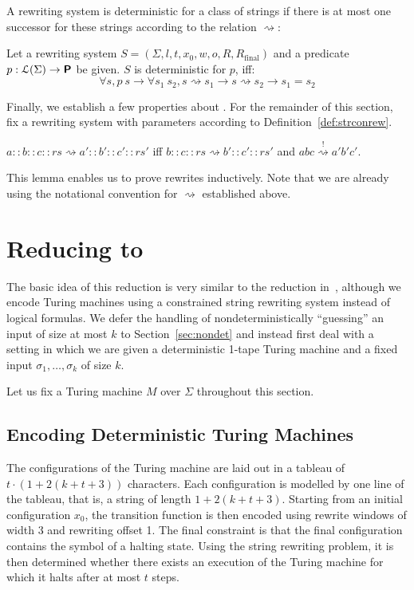 \documentclass[a4paper,UKenglish,cleveref, autoref]{lipics-v2019}
\newcommand{\strent}{\rightsquigarrow}
\newcommand{\constrent}{\overset{!}{\rightsquigarrow}}
\newcommand{\Rfinal}{R_{\text{final}}}
\begin{document}
A rewriting system is deterministic for a class of strings if there is at most one successor for these strings according to the relation $\strent{}$:
\begin{definition}[Determinism]\label{def:rewdet}
  Let a rewriting system $S = (\Sigma, l, t, x_0, w, o, R, \Rfinal)$ and a predicate $p : \mathcal{L} (\Sigma) \rightarrow \textsf{\bfseries P}$ be given. 
  $S$ is deterministic for $p$, iff: 
  \[ \forall s, p~s \rightarrow \forall s_1~s_2, s \strent{} s_1 \rightarrow s \strent{} s_2 \rightarrow s_1 = s_2 \]
\end{definition}




Finally, we establish a few properties about \strconrew{}. For the remainder of this section, fix a rewriting system with parameters according to Definition~\ref{def:strconrew}.

\begin{lemma}\label{lem:rewind}
  $a :: b :: c :: rs \strent{} a' :: b' :: c' :: rs'$ iff $b :: c :: rs \strent{} b' :: c' :: rs'$ and $abc \constrent{} a'b'c'$. 
\end{lemma}
This lemma enables us to prove rewrites inductively. Note that we are already using the notational convention for $\strent{}$ established above.

\section{Reducing \gennp{} to \strconrew{}}
The basic idea of this reduction is very similar to the reduction in~\cite{Sipser:TheoryofComputation}, although we encode Turing machines using a constrained string rewriting system instead of logical formulas. We defer the handling of nondeterministically ``guessing'' an input of size at most $k$ to Section~\ref{sec:nondet} and instead first deal with a setting in which we are given a deterministic 1-tape Turing machine and a fixed input $\sigma_1, \ldots, \sigma_k$ of size $k$. 

Let us fix a Turing machine $M$ over $\Sigma$ throughout this section. 

\subsection{Encoding Deterministic Turing Machines}
The configurations of the Turing machine are laid out in a tableau of $t \cdot (1 + 2(k + t + 3))$ characters. Each configuration is modelled by one line of the tableau, that is, a string of length $1 + 2(k + t + 3)$. Starting from an initial configuration $x_0$, the transition function is then encoded using rewrite windows of width 3 and rewriting offset 1. The final constraint is that the final configuration contains the symbol of a halting state. 
Using the string rewriting problem, it is then determined whether there exists an execution of the Turing machine for which it halts after at most $t$ steps. 
\end{document}
